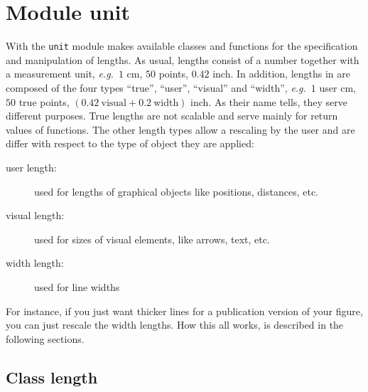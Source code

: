 \chapter{Module unit}
\label{unit}

With the \verb|unit| module \PyX{} makes available classes and
functions for the specification and manipulation of lengths. As usual,
lengths consist of a number together with a measurement unit,
\textit{e.g.}\ $1$ cm, $50$ points, $0.42$ inch.  In addition, lengths
in \PyX{} are composed of the four types ``true'', ``user'',
``visual'' and ``width'', \textit{e.g.}\ $1$ user cm, $50$ true
points, $(0.42\ \mathrm{visual} + 0.2\ \mathrm{width})$ inch.  As
their name tells, they serve different purposes. True lengths are not
scalable and serve mainly for return values of \PyX{} functions.  The
other length types allow a rescaling by the user and are differ with
respect to the type of object they are applied:

\begin{description}
\item[user length:] used for lengths of graphical objects like
  positions, distances, etc.
\item[visual length:] used for sizes of visual elements, like arrows,
  text, etc.
\item[width length:] used for line widths
\end{description}

For instance, if you just want thicker lines for a publication
version of your figure, you can just rescale the width lengths. How
this all works, is described in the following sections.

\section{Class length}

